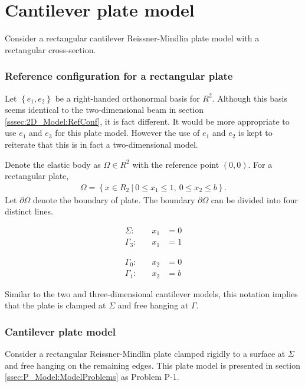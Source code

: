 \documentclass[../../main.tex]{subfiles}
\begin{document}
\section{Cantilever plate model}\label{sec:FEM:Plate}
Consider a rectangular cantilever Reissner-Mindlin plate model with a rectangular cross-section.

\subsubsection{Reference configuration for a rectangular plate}
Let $\left\{e_1,e_2\right\}$ be a right-handed orthonormal basis for $R^2$. Although this basis seems identical to the two-dimensional beam in section \ref{sssec:2D_Model:RefConf}, it is fact different. It would be more appropriate to use $e_1$ and $e_3$ for this plate model. However the use of $e_1$ and $e_2$ is kept to reiterate that this is in fact a two-dimensional model.

Denote the elastic body as $\Omega \in R^2$ with the reference point $(0,0)$. For a rectangular plate,
\begin{eqnarray*}
	\Omega = \left \{ x \in R_2 \ | \ 0 \leq x_1 \leq 1, \ 0 \leq x_2 \leq b \right \}.
\end{eqnarray*}
Let $\partial \Omega$ denote the boundary of plate. The boundary $\partial \Omega$ can be divided into four distinct lines.

\noindent\begin{minipage}{.5\linewidth}
	\begin{eqnarray*}
		\Sigma:& \quad x_1 &= 0\\
		\Gamma_3:& \quad x_1 &= 1
	\end{eqnarray*}
\end{minipage}%
\begin{minipage}{.5\linewidth}
	\begin{eqnarray*}
		\Gamma_0:& \quad x_2 &= 0\\
		\Gamma_1:& \quad x_2 &= b
	\end{eqnarray*}
\end{minipage}

Similar to the two and three-dimensional cantilever models, this notation implies that the plate is clamped at $\Sigma$ and free hanging at $\Gamma$.

\subsubsection{Cantilever plate model}
Consider a rectangular Reissner-Mindlin plate clamped rigidly to a surface at $\Sigma$ and free hanging on the remaining edges. This plate model is presented in section \ref{ssec:P_Model:ModelProblems} as Problem P-1.
\end{document}
